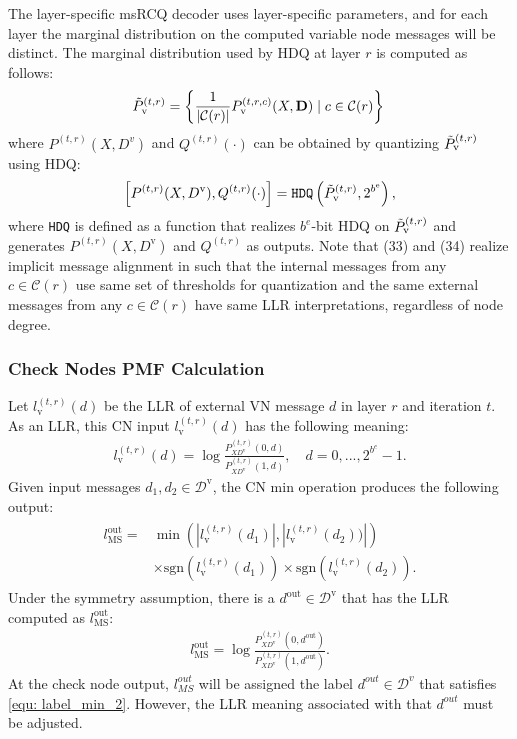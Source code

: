 \documentclass [PhD] {uclathes}
\begin{document}
The layer-specific msRCQ decoder uses layer-specific parameters, and for each layer the marginal distribution on the computed variable node messages will be distinct. The marginal distribution used by HDQ at layer $r$ is computed as follows:
\begin{align}\label{eq: vari_total}
    \Tilde{P}_\text{v}^{(t,r)} = \left\{\frac{1}{|\mathcal{C}(r)|}P_\text{v}^{(t,r,c)}(X,\mathbf{D})\mid c\in\mathcal{C}(r)\right\}\,
\end{align}
 where ${P}^{(t,r)}(X,D^v)$ and $Q^{(t,r)}(\cdot)$ can be obtained by quantizing  $\Tilde{P}_\text{v}^{(t,r)}$ using HDQ:
\begin{align}\label{eq: vari_hdq}
    \left[P^{(t,r)}(X,D^{\text{v}}),Q^{(t,r)}(\cdot) \right] = \texttt{HDQ}\left(\Tilde{P}_\text{v}^{(t,r)}, 2^{b^\mathrm{e}}\right),
\end{align}
where \texttt{HDQ} is defined as a function that realizes $b^e$-bit HDQ on  $\Tilde{P}_\text{v}^{(t,r)}$ and generates $P^{(t,r)}(X,D^{\text{v}})$ and $Q^{(t,r)}$ as outputs. Note that (33) and (34) realize implicit message alignment in \cite{Stark2021-ai} such that the internal messages from  any  $c\in\mathcal{C}(r)$  use same set of thresholds for quantization and the same external messages from any $c\in\mathcal{C}(r)$ have same LLR interpretations, regardless of node degree.

\subsubsection{Check Nodes PMF Calculation}
Let $l^{(t,r)}_\text{v}{(d)}$ be the LLR of external VN message $d$ in layer $r$ and iteration $t$.  As an LLR, this CN input  $l^{(t,r)}_\text{v}{(d)}$ has the following meaning: 
\begin{align}
    l_\text{v}^{(t,r)}(d) = \log \frac{P_{XD^\text{v}}^{(t,r)}(0,d)}{P_{XD^\text{v}}^{(t,r)}(1,d)},\quad d=0,...,2^{b^{e}}-1.
\end{align}
Given input messages $d_1,d_2\in {\mathcal D}^\text{v}$, the CN min operation produces the following output:
\begin{align}\label{equ: label_min}
\begin{split}
     l_{\text{MS}}^{\text{out}} =&\min\left(|l_\text{v}^{(t,r)}(d_1)|,|l_\text{v}^{(t,r)}(d_2))|\right)\\&\times \text{sgn}(l_\text{v}^{(t,r)}(d_1))\times\text{sgn}(l_\text{v}^{(t,r)}(d_2)). 
\end{split}
\end{align}
Under the symmetry assumption, there is a $d^{\text{out}}\in {\mathcal D}^\text{v}$ that has the LLR computed as $l_{\text{MS}}^{\text{out}}$:
\begin{align}\label{equ: label_min_2}
    l_{\text{MS}}^{\text{out}}=\log \frac{P^{(t,r)}_{XD^\text{v}}(0,d^{\text{out}})}{P^{(t,r)}_{XD^\text{v}}(1,d^{\text{out}})}.
\end{align}
At the check node output, $l_{MS}^{out}$ will be assigned the label $d^{out}\in {\mathcal D}^v$ that satisfies \eqref{equ: label_min_2}.  However, the LLR meaning associated with that $d^{out}$ must be adjusted. 
\end{document}
